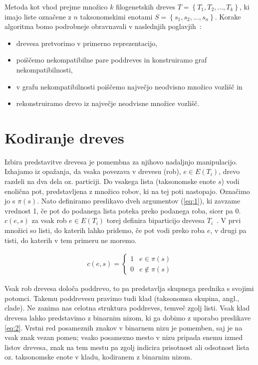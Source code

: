 \documentclass[a4paper, 12pt]{book}
\begin{document}
Metoda kot vhod prejme množico $k$ filogenetskih dreves 
$T = \left\{ {T_1, T_2, ..., T_k} \right\}$, ki imajo liste označene z $n$ 
taksonomskimi enotami $S = \left\{ {s_1, s_2, ..., s_n} \right\}$. 
Korake algoritma bomo podrobneje obravnavali
 v naslednjih poglavjih~\cite{pw}:
\begin{itemize}
	\item drevesa pretvorimo v primerno reprezentacijo,
	\item poiščemo nekompatibilne pare poddreves in konstruiramo graf nekompatibilnosti,
	\item v grafu nekompatibilnosti poiščemo največjo neodvisno množico vozlišč in
	\item rekonstruiramo drevo iz največje neodvisne množice vozlišč.
\end{itemize}

\section{Kodiranje dreves}
Izbira predstavitve drevesa je pomembna za njihovo nadaljnjo manipulacijo. Izhajamo iz 
opažanja, da vsaka povezava v drevesu (rob), $e \in E(T_i)$, drevo razdeli na dva dela oz. particiji.
Do vsakega lista (taksonomske enote $s$) vodi enolična pot, predstavljena z množico 
robov, ki na tej poti nastopajo. Označimo jo s $\pi(s)$. Nato definiramo preslikavo 
dveh argumentov (\ref{eq:1}), ki zavzame vrednost 1, če pot do podanega lista 
poteka preko podanega roba, sicer pa 0. $c(e, s)$ za vsak rob $e \in E(T_i)$ torej 
definira biparticijo drevesa $T_i$~\cite{pw}. V prvi množici so listi, do katerih 
lahko pridemo, če pot vodi preko roba $e$, v drugi pa tisti, do katerih v tem 
primeru ne moremo.

\begin{align}
	c(e, s) = 
	\left\{
		\begin{array}{ll}
			1 & e \in \pi(s) \\
			0 & e \notin \pi(s)
		\end{array}
	\right.
	\label{eq:1}
\end{align}

\noindent Vsak rob drevesa določa poddrevo, to pa predstavlja skupnega prednika s svojimi 
potomci. Takemu poddrevesu pravimo tudi klad (taksonomsa skupina, angl., clade). Ne zanima nas
celotna struktura poddreves, temveč zgolj listi. Vsak klad drevesa lahko 
predstavimo z binarnim nizom, ki ga dobimo z uporabo preslikave \ref{eq:2}.
Vrstni red posameznih znakov v binarnem nizu je
pomemben, saj je na vsak znak vezan pomen; vsako posamezno mesto v nizu pripada 
enemu izmed listov drevesa, znak na tem mestu pa zgolj indicira prisotnost ali
odsotnost lista oz. taksonomske enote v kladu, kodiranem z binarnim nizom.
\end{document}
